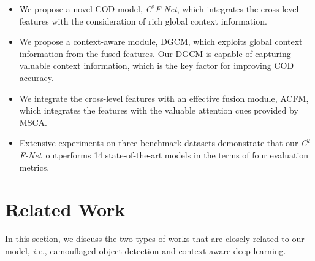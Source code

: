 \documentclass{article}
\def\ie{\emph{i.e.}}
\def\OurModel{\textit{C$^2$F-Net}} %
\begin{document}
\begin{itemize}
    
    \item We propose a novel COD model, \OurModel, which integrates the cross-level features with the consideration of rich global context information.
    
    \vspace{-5pt}
    \item We propose a context-aware module, DGCM, which exploits global context information from the fused features. Our DGCM is capable of capturing valuable context information, which is the key factor for improving COD accuracy. 
    
    \vspace{-5pt}
    \item We integrate the cross-level features with an effective fusion module, ACFM, which integrates the features with the valuable attention cues provided by MSCA. %
    
    \vspace{-5pt}
    \item Extensive experiments on three benchmark datasets demonstrate that our \OurModel~outperforms 14 state-of-the-art models in the terms of four evaluation metrics.
\end{itemize}

\section{Related Work}

In this section, we discuss the two types of works that are closely related to our model, \ie, camouflaged object detection and context-aware deep learning.
\end{document}
